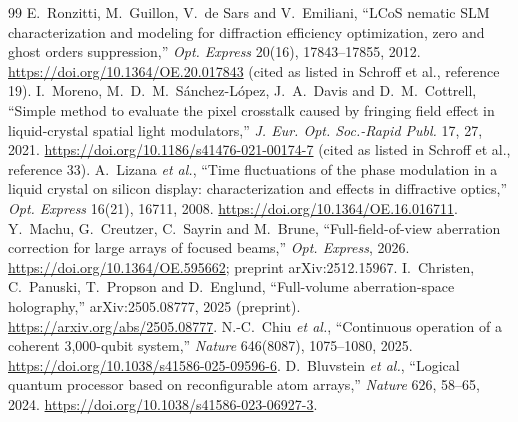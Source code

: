 \documentclass[10pt,a4paper]{article}
\begin{document}
\begin{thebibliography}{99}
 E.~Ronzitti, M.~Guillon, V.~de Sars and V.~Emiliani, ``LCoS nematic SLM characterization and modeling for diffraction efficiency optimization, zero and ghost orders suppression,'' \emph{Opt. Express} 20(16), 17843--17855, 2012. \url{https://doi.org/10.1364/OE.20.017843} (cited as listed in Schroff et al., reference 19).
 I.~Moreno, M.~D.~M.~S\'anchez-L\'opez, J.~A.~Davis and D.~M.~Cottrell, ``Simple method to evaluate the pixel crosstalk caused by fringing field effect in liquid-crystal spatial light modulators,'' \emph{J. Eur. Opt. Soc.-Rapid Publ.} 17, 27, 2021. \url{https://doi.org/10.1186/s41476-021-00174-7} (cited as listed in Schroff et al., reference 33).
 A.~Lizana \emph{et al.}, ``Time fluctuations of the phase modulation in a liquid crystal on silicon display: characterization and effects in diffractive optics,'' \emph{Opt. Express} 16(21), 16711, 2008. \url{https://doi.org/10.1364/OE.16.016711}.
 Y.~Machu, G.~Creutzer, C.~Sayrin and M.~Brune, ``Full-field-of-view aberration correction for large arrays of focused beams,'' \emph{Opt. Express}, 2026. \url{https://doi.org/10.1364/OE.595662}; preprint arXiv:2512.15967.
 I.~Christen, C.~Panuski, T.~Propson and D.~Englund, ``Full-volume aberration-space holography,'' arXiv:2505.08777, 2025 (preprint). \url{https://arxiv.org/abs/2505.08777}.
 N.-C.~Chiu \emph{et al.}, ``Continuous operation of a coherent 3,000-qubit system,'' \emph{Nature} 646(8087), 1075--1080, 2025. \url{https://doi.org/10.1038/s41586-025-09596-6}.
 D.~Bluvstein \emph{et al.}, ``Logical quantum processor based on reconfigurable atom arrays,'' \emph{Nature} 626, 58--65, 2024. \url{https://doi.org/10.1038/s41586-023-06927-3}.

\end{thebibliography}
\end{document}
